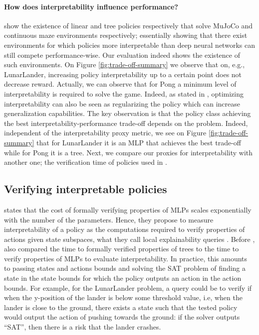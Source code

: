 \paragraph{How does interpretability influence performance?}
\cite{empirical-evidence,theory1} show the existence of linear and tree policies respectively that solve MuJoCo and continuous maze environments respectively; essentially showing that there exist environments for which policies more interpretable than deep neural networks can still compete performance-wise.
Our evaluation indeed shows the existence of such environments. On Figure \ref{fig:trade-off-summary} we observe that on, e.g., 
LunarLander, increasing policy interpretability up to a certain point does not decrease reward.
Actually, we can observe that for Pong a minimum level of interpretability is required to solve the game.
Indeed, as stated in \cite{study-0}, optimizing interpretability can also be seen as regularizing the policy which can increase generalization capabilities. 
The key observation is that the policy class achieving the best interpretability-performance trade-off depends on the problem.
Indeed, independent of the interpretability proxy metric, we see on Figure \ref{fig:trade-off-summary} that for LunarLander it is an MLP that achieves the best trade-off while for Pong it is a tree.
Next, we compare our proxies for interpretability with another one; the verification time of policies used in \cite{viper,lens-complexity}.


\subsection{Verifying interpretable policies}
\cite{lens-complexity} states that the cost of formally verifying properties of MLPs scales exponentially with the number of the parameters.
Hence, they propose to measure interpretability of a policy as the computations required to verify properties of actions given state subspaces, what they call local explainability queries \cite{query}.
Before \cite{lens-complexity}, \cite{viper} also compared the time to formally verified properties of trees to the time to verify properties of MLPs to evaluate interpretability.
In practice, this amounts to passing states and actions bounds and solving the SAT problem of finding a state in the state bounds for which the policy outputs an action in the action bounds.
For example, for the LunarLander problem, a query could be to verify if when the y-position of the lander is below some threshold value, i.e, when the lander is close to the ground, there exists a state such that the tested policy would output the action of pushing towards the ground: if the solver outputs ``SAT'', then there is a risk that the lander crashes. 

